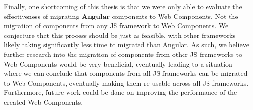 Finally, one shortcoming of this thesis is that we were only able to evaluate the effectiveness of migrating \textbf{Angular} components to Web Components. Not the migration of components from any JS framework to Web Components. We conjecture that this process should be just as feasible, with other frameworks likely taking significantly less time to migrated than Angular. As such, we believe further research into the migration of components from other JS frameworks to Web Components would be very beneficial, eventually leading to a situation where we can conclude that components from all JS frameworks can be migrated to Web Components, eventually making them re-usable across all JS frameworks. Furthermore, future work could be done on improving the performance of the created Web Components.
